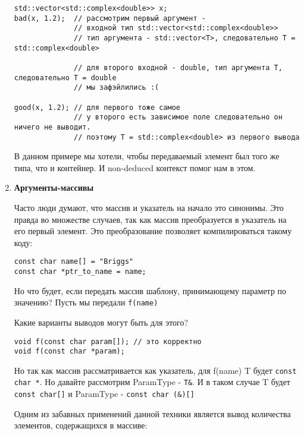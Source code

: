 \begin{enumerate}
\begin{verbatim}
std::vector<std::complex<double>> x;
bad(x, 1.2);  // рассмотрим первый аргумент -
			  // входной тип std::vector<std::complex<double>>
			  // тип аргумента - std::vector<T>, следовательно T = std::complex<double>

			  // для второго входной - double, тип аргумента T, следовательно T = double
			  // мы зафэйлились :(

good(x, 1.2); // для первого тоже самое
			  // у второго есть зависимое поле следовательно он ничего не выводит.
			  // поэтому T = std::complex<double> из первого вывода
\end{verbatim}
				
				В данном примере мы хотели, чтобы передаваемый элемент был того же типа, что и контейнер. И non-deduced контекст помог нам в этом.
				
				\item \textbf{Аргументы-массивы}
				
				Часто люди думают, что массив и указатель на начало это синонимы. Это правда во множестве случаев, так как массив преобразуется в указатель на его первый элемент. Это преобразование позволяет компилироваться такому коду:
				
\begin{verbatim}
const char name[] = "Briggs"
const char *ptr_to_name = name;
\end{verbatim}
				
				Но что будет, если передать массив шаблону, принимающему параметр по значению?
				Пусть мы передали \texttt{f(name)}
				
				Какие варианты выводов могут быть для этого?
				
\begin{verbatim}
void f(const char param[]); // это корректно
void f(const char *param);
\end{verbatim}
				
				Но так как массив рассматривается как указатель, для f(name) T будет \texttt{const char *}.
				Но давайте рассмотрим ParamType - \texttt{T&}. И в таком случае T будет \texttt{const char[]} и ParamType -  \texttt{const char (&)[]}
				
				Одним из забавных применений данной техники является вывод количества элементов, содержащихся в массиве:
				

\end{enumerate}
